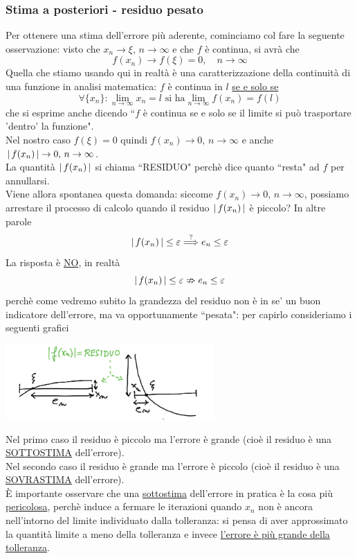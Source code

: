 \subsubsection{Stima a posteriori - residuo pesato}
Per ottenere una stima dell'errore più aderente, cominciamo col fare la seguente osservazione: visto che $x_n \to \xi,\,n\to \infty$ e che $f$ è continua, si avrà che \[f(x_n) \to f(\xi)=0,\quad n \to \infty\]
Quella che stiamo usando qui in realtà è una caratterizzazione della continuità di una funzione in analisi matematica: $f$ è continua in $l$ \uline{se e solo se}
\[\forall \{x_n\}:\lim_{n\to \infty}x_n=l \text{ si ha} \lim_{n\to \infty}f(x_n)=f(l)\]
che si esprime anche dicendo ``$f$ è continua se e solo se il limite si può trasportare 'dentro' la funzione".\\
Nel nostro caso $f(\xi)=0$ quindi $f(x_n) \to 0,\,n \to \infty$ e anche $\lvert\,f(x_n)\,\rvert\to 0,\,n \to \infty$.\\
La quantità $\lvert\,f(x_n)\,\rvert$ si chiama ``RESIDUO" perchè dice quanto ``resta" ad $f$ per annullarsi.\\
Viene allora spontanea questa domanda: siccome $f(x_n) \to 0,\,n \to \infty$, possiamo arrestare il processo di calcolo quando il residuo $\lvert\,f(x_n)\,\rvert$ è piccolo? In altre parole
\[\lvert\,f(x_n)\,\rvert\le \varepsilon \overset{?}{\Longrightarrow} e_n \le \varepsilon\]
La risposta è \uline{NO}, in realtà\\
\[\lvert\,f(x_n)\,\rvert\le \varepsilon \nRightarrow e_n\le \varepsilon\]
perchè come vedremo subito la grandezza del residuo non è in se' un buon indicatore dell'errore, ma va opportunamente ``pesata": per capirlo consideriamo i seguenti grafici\\
\begin{center}
    \includegraphics[width=0.6\textwidth]{foto/grafo4}
\end{center}
Nel primo caso il residuo è piccolo ma l'errore è grande (cioè il residuo è una \uline{SOTTOSTIMA} dell'errore).\\
Nel secondo caso il residuo è grande ma l'errore è piccolo (cioè il residuo è una \uline{SOVRASTIMA} dell'errore).\\
È importante osservare che una \uline{sottostima} dell'errore in pratica è la cosa più \uline{pericolosa}, perchè induce a fermare le iterazioni quando $x_{n}$ non è ancora nell'intorno del limite individuato dalla tolleranza: si pensa di aver approssimato la quantità limite a meno della tolleranza e invece \uline{l'errore è più grande della tolleranza}.\\
